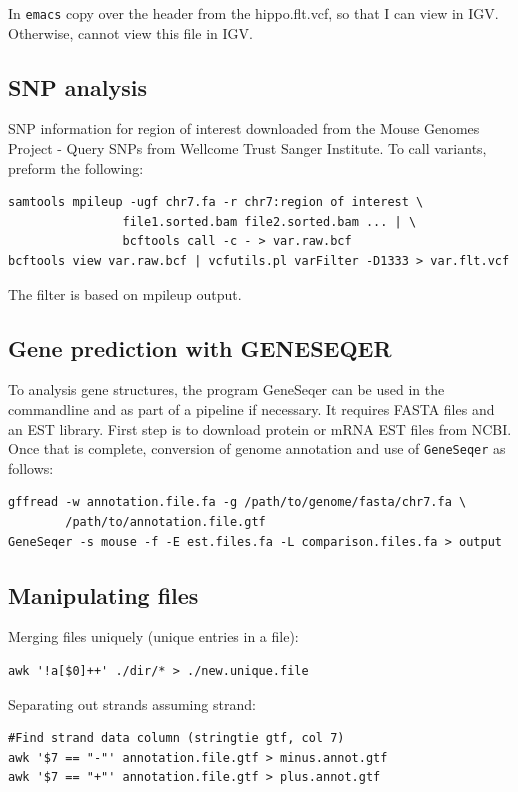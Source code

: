 In \texttt{emacs} copy over the header from the hippo.flt.vcf, so that I can view in IGV. Otherwise, cannot view this file in IGV.

\subsection{SNP analysis}
SNP information for region of interest downloaded from the Mouse Genomes Project - Query SNPs from Wellcome Trust Sanger Institute. To call variants, preform the following:
\begin{verbatim}
samtools mpileup -ugf chr7.fa -r chr7:region of interest \
                file1.sorted.bam file2.sorted.bam ... | \
                bcftools call -c - > var.raw.bcf
bcftools view var.raw.bcf | vcfutils.pl varFilter -D1333 > var.flt.vcf
\end{verbatim}

The filter is based on mpileup output.

\subsection{Gene prediction with GENESEQER}
To analysis gene structures, the program GeneSeqer can be used in the commandline and as part of a pipeline if necessary. It requires FASTA files and an EST library. First step is to download protein or mRNA EST files from NCBI. Once that is complete, conversion of genome annotation and use of \texttt{GeneSeqer} as follows:
\begin{verbatim}
gffread -w annotation.file.fa -g /path/to/genome/fasta/chr7.fa \
        /path/to/annotation.file.gtf
GeneSeqer -s mouse -f -E est.files.fa -L comparison.files.fa > output
\end{verbatim}

\subsection{Manipulating files}
Merging files uniquely (unique entries in a file):
\begin{verbatim}
awk '!a[$0]++' ./dir/* > ./new.unique.file
\end{verbatim}

Separating out strands assuming strand:
\begin{verbatim}
#Find strand data column (stringtie gtf, col 7)
awk '$7 == "-"' annotation.file.gtf > minus.annot.gtf
awk '$7 == "+"' annotation.file.gtf > plus.annot.gtf
\end{verbatim}

